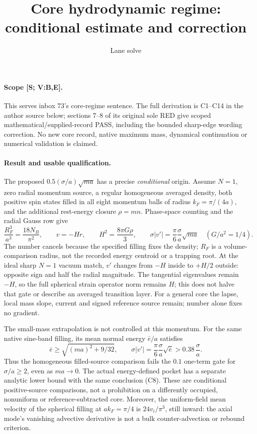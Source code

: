 \documentclass[11pt]{article}
\begin{document}
\title{Core hydrodynamic regime: conditional estimate and correction}
\author{Lane solve}
\date{}
\maketitle

\paragraph{Scope [S; V:B,E].}
This serves inbox 73's core-regime sentence. The full derivation
is C1--C14 in the author source below; sections 7--8 of its
original sole RED give scoped mathematical/supplied-record PASS,
including the bounded sharp-edge wording correction.
No new core record, native maximum mass, dynamical
continuation or numerical validation is claimed.

\paragraph{Result and usable qualification.}
The proposed \(0.5(\sigma/a)\sqrt{ma}\) has a precise
\emph{conditional} origin. Assume \(N=1\), zero radial momentum
source, a regular homogeneous averaged density, both positive
spin states filled in all eight momentum balls of radius
\(k_F=\pi/(4a)\), and the additional rest-energy closure
\(\rho=mn\). Phase-space counting and the radial Gauss row give
\[
 \frac{R_F^3}{a^3}=\frac{18N_B}{\pi^2},\qquad
 v=-Hr,\qquad H^2=\frac{8\pi G\rho}{3},\qquad
 \sigma|v'|=\frac{\pi}{6}\frac{\sigma}{a}\sqrt{ma}
       \quad(G/a^2=1/4).
\]
The number cancels because the specified filling fixes the
density; \(R_F\) is a volume-comparison radius, not the recorded
energy centroid or a trapping root. At the ideal sharp \(N=1\)
vacuum match, \(v'\) changes from \(-H\) inside to \(+H/2\)
outside: opposite sign and half the radial magnitude.
The tangential eigenvalues remain \(-H\), so the full spherical
strain operator norm remains \(H\); this does not halve that
gate or describe an averaged transition layer.
For a general core the lapse, local mass slope, current and
signed reference source remain; number alone fixes no gradient.

The small-mass extrapolation is not controlled at this momentum.
For the same native sine-band filling, its mean normal energy
\(\bar e/a\) satisfies
\[
 \bar e\ge\sqrt{(ma)^2+9/32},\qquad
 \sigma|v'|=\frac{\pi}{6}\frac{\sigma}{a}\sqrt{\bar e}
       >0.38\,\frac{\sigma}{a}.
\]
Thus the homogeneous filled-source comparison fails the
\(0.1\) one-term gate for \(\sigma/a\ge2\), even as \(ma\to0\).
The actual energy-defined pocket has a separate analytic
lower bound with the same conclusion (C8). These are conditional
positive-source comparisons, not a prohibition on a differently
occupied, nonuniform or reference-subtracted core.
Moreover, the uniform-field mean velocity of the spherical
filling at \(ak_F=\pi/4\) is \(24v_i/\pi^3\), still inward:
the axial mode's vanishing advective derivative is not a bulk
counter-advection or rebound criterion.
\end{document}
